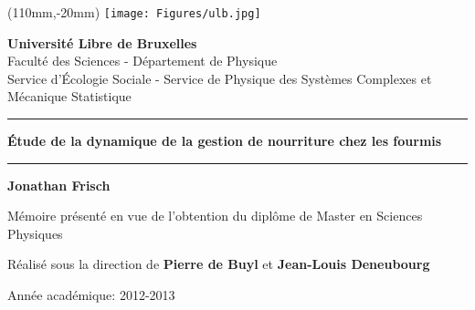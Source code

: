 \begin{titlingpage}




\begin{textblock*}{3cm}(110mm,-20mm)
\texttt{[image: Figures/ulb.jpg]}
\end{textblock*} 


	
  \begin{center}
    {\LARGE \textbf{Universit{\'e} Libre de Bruxelles} \\ }
    \bigskip
    {\Large Faculté des Sciences - Département de Physique\\}
    \bigskip
    {\Large Service d'Écologie Sociale - Service de Physique des Systèmes Complexes et Mécanique Statistique\\}
  \end{center}
\bigskip


  \begin{center}
    \rule{\linewidth}{1pt}\par\vskip 6pt%
    {\huge \textbf{Étude de la dynamique de la gestion de nourriture chez les fourmis}}
    \rule{\linewidth}{1pt}\par\vskip 6pt%

    \bigskip
    {\Large \textbf{Jonathan Frisch}}
    \bigskip
  \end{center}


  \begin{center}

    {\large Mémoire présenté en vue de l'obtention du diplôme de Master en Sciences Physiques\\}
    \bigskip
    \bigskip

    {\large Réalisé sous la direction de \textbf{Pierre de Buyl} et \textbf{Jean-Louis Deneubourg} 
      }
  \end{center}
  \bigskip

  \begin{center}
    {\large Année académique: 2012-2013}
  \end{center}
  
  

\end{titlingpage}